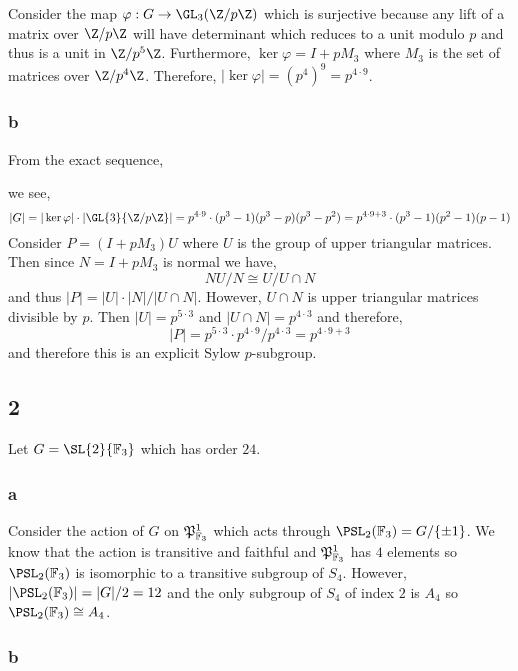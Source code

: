 \documentclass[12pt]{article}
\renewcommand{\F}{\mathbb{F}}
\begin{document}
Consider the map $\varphi : G \to \GL_{3}(\Z/p \Z)$ which is surjective because any lift of a matrix over $\Z / p \Z$ will have determinant which reduces to a unit modulo $p$ and thus is a unit in $\Z / p^5 \Z$. Furthermore, $\ker{\varphi} = I + p M_3$ where $M_3$ is the set of matrices over $\Z / p^4 \Z$. Therefore, $|\ker{\varphi}| = (p^4)^9 = p^{4 \cdot 9}$.

\subsubsection{b}

From the exact sequence,
\begin{center}
\end{center}
we see,
\[ |G| = |\ker{\varphi}| \cdot |\GL{3}{\Z/p\Z}| = p^{4 \cdot 9} \cdot (p^3 - 1)(p^3 - p)(p^3 - p^2) = p^{4 \cdot 9 + 3} \cdot (p^3 - 1)(p^2 - 1)(p - 1) \]
Consider $P = (I + p M_3) U$ where $U$ is the group of upper triangular matrices. Then since $N = I + p M_3$ is normal we have,
\[ NU/N \cong U / U \cap N \]
and thus $|P| = |U| \cdot |N| /|U \cap N|$. However, $U \cap N$ is upper triangular matrices divisible by $p$. Then $|U| = p^{5 \cdot 3}$ and $|U \cap N| = p^{4 \cdot 3}$ and therefore,
\[ |P| = p^{5 \cdot 3} \cdot p^{4 \cdot 9} / p^{4 \cdot 3} = p^{4 \cdot 9 + 3} \]
and therefore this is an explicit Sylow $p$-subgroup.

\subsection{2}

Let $G = \SL{2}{\F_3}$ which has order $24$.

\subsubsection{a}

Consider the action of $G$ on $\P^1_{\F_3}$ which acts through $\PSL_{2}(\F_3) = G / \{ \pm 1 \}$. We know that the action is transitive and faithful and $\P^1_{\F_3}$ has $4$ elements so $\PSL_{2}(\F_3)$ is isomorphic to a transitive subgroup of $S_4$. However, $|\PSL_{2}(\F_3)| = |G|/2 = 12$ and the only subgroup of $S_4$ of index $2$ is $A_4$ so $\PSL_{2}(\F_3) \cong A_4$.

\subsubsection{b}
\end{document}
